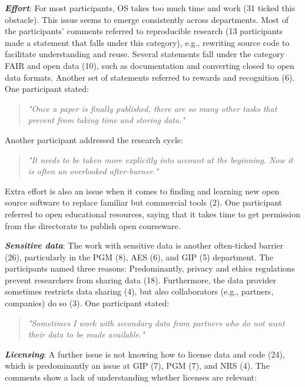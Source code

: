 \documentclass[gc, manuscript]{copernicus}
\begin{document}
\textit{\textbf{Effort}}: For most participants, OS takes too much time
and work (31 ticked this obstacle). This issue seems to emerge
consistently across departments. Most of the participants' comments
referred to reproducible research (13 participants made a statement that
falls under this category), e.g., rewriting source code to facilitate
understanding and reuse. Several statements fall under the category FAIR
and open data (10), such as documentation and converting closed to open
data formats. Another set of statements referred to rewards and
recognition (6). One participant stated:

\begin{quote}
\textit{"Once a paper is finally published, there are so many other tasks that prevent from taking time and storing data."}
\end{quote}

Another participant addressed the research cycle:

\begin{quote}
\textit{"It needs to be taken more explicitly into account at the beginning. Now it is often an overlooked after-burner."}
\end{quote}

Extra effort is also an issue when it comes to finding and learning new
open source software to replace familiar but commercial tools (2). One
participant referred to open educational resources, saying that it takes
time to get permission from the directorate to publish open courseware.

\textit{\textbf{Sensitive data}}: The work with sensitive data is
another often-ticked barrier (26), particularly in the PGM (8), AES (6),
and GIP (5) department. The participants named three reasons:
Predominantly, privacy and ethics regulations prevent researchers from
sharing data (18). Furthermore, the data provider sometimes restricts
data sharing (4), but also collaborators (e.g., partners, companies) do
so (3). One participant stated:

\begin{quote}
\textit{"Sometimes I work with secondary data from partners who do not want their data to be made available."}
\end{quote}

\textit{\textbf{Licensing}}: A further issue is not knowing how to
license data and code (24), which is predominantly an issue at GIP (7),
PGM (7), and NRS (4). The comments show a lack of understanding whether
licenses are relevant:
\end{document}
